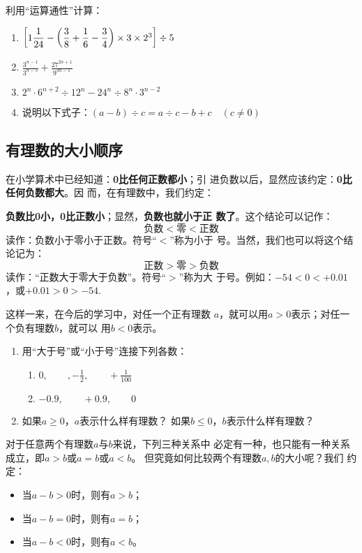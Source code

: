 \begin{ex}
    利用“运算通性”计算：
    \begin{enumerate}
        \item $\left[1\dfrac{1}{24}-\left(\dfrac{3}{8}+\dfrac{1}{6}-\dfrac{3}{4}\right)\times3\times2^3\right]\div 5$
        \item $\frac{3^{n-1}}{3^{n-5}}+\frac{27^{2n+1}}{9^{3n-1}}$
        \item $2^n\cdot 6^{n+2}\div 12^n-24^n\div 8^n\cdot 3^{n-2}$
        \item 说明以下式子：$(a-b)\div c=a\div c-b+c\quad (c\ne 0)$
    \end{enumerate}

\end{ex}

\subsection{有理数的大小顺序}
    在小学算术中已经知道：\textbf{0比任何正数都小}；引
进负数以后，显然应该约定：\textbf{0比任何负数都大}。因
而，在有理数中，我们约定：

\textbf{负数比0小，0比正数小}；显然，\textbf{负数也就小于正
数了}。这个结论可以记作：
\[\text{负数}<\text{零}<\text{正数}\]
读作：负数小于零小于正数。符号“$<$”称为小于
号。当然，我们也可以将这个结论记为：
\[\text{正数}>\text{零}>\text{负数}\]
读作：“正数大于零大于负数”。符号“$>$”称为大
于号。例如：$-54<0<+0.01$，或$+0.01>0> -54$.

这样一来，在今后的学习中，对任一个正有理数
$a$，就可以用$a>0$表示；对任一个负有理数$b$，就可以
用$b<0$表示。

\begin{ex}
\begin{enumerate}
    \item 用“大于号”或“小于号”连接下列各数：
\begin{enumerate}
    \item $0,\qquad ,-\frac{1}{2},\qquad +\frac{1}{100}$
    \item $-0.9,\qquad +0.9,\qquad 0$
\end{enumerate}
\item 如果$a\ge 0$，$a$表示什么样有理数？
如果$b\le 0$，$b$表示什么样有理数？
\end{enumerate}
 \end{ex}   

    对于任意两个有理数$a$与$b$来说，下列三种关系中
必定有一种，也只能有一种关系成立，即$a>b$或$a =b$或$a<b$。
    但究竟如何比较两个有理数$a,  b$的大小呢？我们
约定：
\begin{itemize}
    \item 当$a-b>0$时，则有$a > b$；
    \item     当$a-b=0$时，则有$a=b$；
    \item   当$a-b<0$时，则有$a < b$。
\end{itemize}

